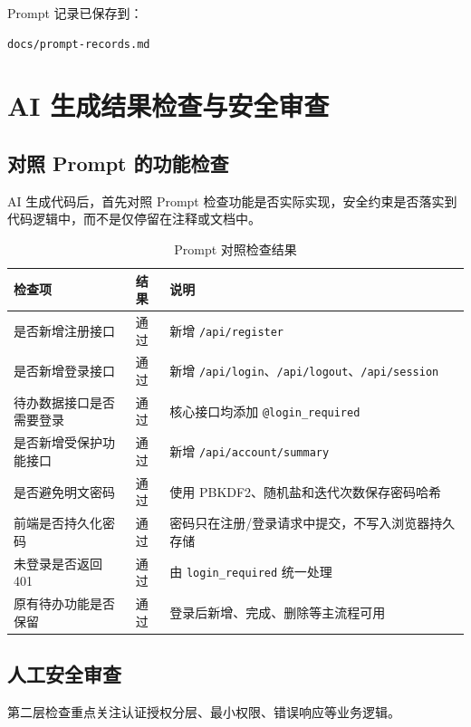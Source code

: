 \documentclass[12pt,a4paper]{ctexart}
\begin{document}
Prompt 记录已保存到：

\begin{verbatim}
docs/prompt-records.md
\end{verbatim}

\section{AI 生成结果检查与安全审查}

\subsection{对照 Prompt 的功能检查}

AI 生成代码后，首先对照 Prompt 检查功能是否实际实现，安全约束是否落实到代码逻辑中，而不是仅停留在注释或文档中。

\begin{table}[H]
    \centering
    \caption{Prompt 对照检查结果}
    \begin{tabularx}{\textwidth}{L{5cm}C{2cm}Y}
        \toprule
        检查项 & 结果 & 说明 \\
        \midrule
        是否新增注册接口 & 通过 & 新增 \texttt{/api/register} \\
        是否新增登录接口 & 通过 & 新增 \texttt{/api/login}、\texttt{/api/logout}、\texttt{/api/session} \\
        待办数据接口是否需要登录 & 通过 & 核心接口均添加 \texttt{@login\_required} \\
        是否新增受保护功能接口 & 通过 & 新增 \texttt{/api/account/summary} \\
        是否避免明文密码 & 通过 & 使用 PBKDF2、随机盐和迭代次数保存密码哈希 \\
        前端是否持久化密码 & 通过 & 密码只在注册/登录请求中提交，不写入浏览器持久存储 \\
        未登录是否返回 401 & 通过 & 由 \texttt{login\_required} 统一处理 \\
        原有待办功能是否保留 & 通过 & 登录后新增、完成、删除等主流程可用 \\
        \bottomrule
    \end{tabularx}
\end{table}

\subsection{人工安全审查}

第二层检查重点关注认证授权分层、最小权限、错误响应等业务逻辑。
\end{document}
